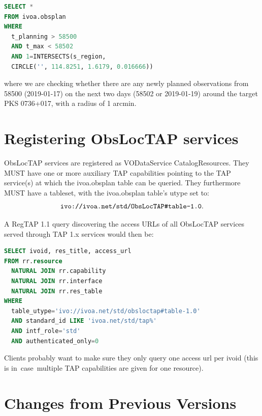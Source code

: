 \documentclass[11pt,a4paper]{ivoa}
\begin{document}
\begin{lstlisting}[language=SQL]
SELECT * 
FROM ivoa.obsplan
WHERE
  t_planning > 58500
  AND t_max < 58502
  AND 1=INTERSECTS(s_region,
  CIRCLE('', 114.8251, 1.6179, 0.016666))
\end{lstlisting}
where we are checking whether there are any newly planned observations from
58500 (2019-01-17) on the next two days (58502 or 2019-01-19) around the target
PKS 0736+017, with a radius of 1 arcmin.
\par


\section{Registering ObsLocTAP services}
\label{sec:Registering}
ObsLocTAP services are registered as VODataService CatalogResources. They MUST
have one or more auxiliary TAP capabilities pointing to the TAP service(s) at
which the ivoa.obsplan table can be queried. They furthermore MUST have a
tableset, with the ivoa.obsplan table's utype set to:
$$\hbox{\verb|ivo://ivoa.net/std/ObsLocTAP#table-1.0|}.$$

A RegTAP 1.1 query discovering the access URLs of all ObsLocTAP services served
through TAP 1.x services would then be:

\begin{lstlisting}[language=SQL]
SELECT ivoid, res_title, access_url
FROM rr.resource
  NATURAL JOIN rr.capability
  NATURAL JOIN rr.interface
  NATURAL JOIN rr.res_table
WHERE
  table_utype='ivo://ivoa.net/std/obsloctap#table-1.0'
  AND standard_id LIKE 'ivoa.net/std/tap%'
  AND intf_role='std'
  AND authenticated_only=0
\end{lstlisting}
Clients probably want to make sure they only query one access url per ivoid
(this is in\ case\ multiple TAP capabilities are given for one resource).
\par

\appendix
\section{Changes from Previous Versions}

\end{document}
